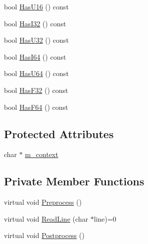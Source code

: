 \begin{DoxyCompactItemize}
\item 
bool \hyperlink{classmage_1_1_line_reader_af2c4d2414dbcaa2edb968725d2cd1555}{Has\+U16} () const
\item 
bool \hyperlink{classmage_1_1_line_reader_a5034991b4599374b66bb9f70ca9d306c}{Has\+I32} () const
\item 
bool \hyperlink{classmage_1_1_line_reader_a81ef171c6511a7b270a5b8d58181715c}{Has\+U32} () const
\item 
bool \hyperlink{classmage_1_1_line_reader_ab9bb3be576c9c9faa0e19a8652a0f62d}{Has\+I64} () const
\item 
bool \hyperlink{classmage_1_1_line_reader_a638e055df8a1850e2e5cb9c91f8c54fc}{Has\+U64} () const
\item 
bool \hyperlink{classmage_1_1_line_reader_a2b2b2719576045b6531a2b8b31c61cee}{Has\+F32} () const
\item 
bool \hyperlink{classmage_1_1_line_reader_a65f4edadd232fdd19c7ba9d044c7d2aa}{Has\+F64} () const
\end{DoxyCompactItemize}
\subsection*{Protected Attributes}
\begin{DoxyCompactItemize}
\item 
char $\ast$ \hyperlink{classmage_1_1_line_reader_a2f1cfe313dc89741386178e63a6b8b0c}{m\+\_\+context}
\end{DoxyCompactItemize}
\subsection*{Private Member Functions}
\begin{DoxyCompactItemize}
\item 
virtual void \hyperlink{classmage_1_1_line_reader_a4de135cfb0434be786cfcfd7959031ef}{Preprocess} ()
\item 
virtual void \hyperlink{classmage_1_1_line_reader_acfb2f7279ec77d070a86d7db812d4745}{Read\+Line} (char $\ast$line)=0
\item 
virtual void \hyperlink{classmage_1_1_line_reader_adfde21013140a1058d3dd567204abfb5}{Postprocess} ()
\end{DoxyCompactItemize}
